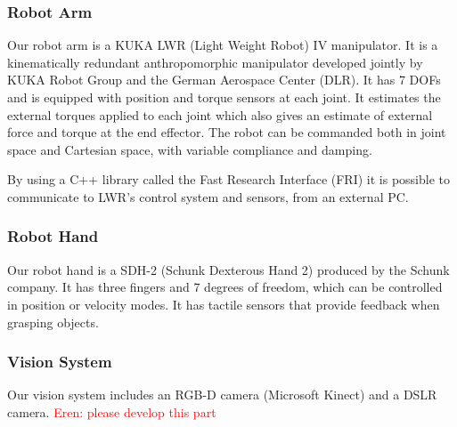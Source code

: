 \subsubsection{Robot Arm}
Our robot arm is a KUKA LWR (Light Weight Robot) IV manipulator.
It is a kinematically redundant anthropomorphic manipulator developed jointly by KUKA Robot Group and the German Aerospace Center (DLR).
It has 7 DOFs and is equipped with position and torque sensors at each joint.
It estimates the external torques applied to each joint which also gives an estimate of external force and torque at the end effector.
The robot can be commanded both in joint space and Cartesian space, with variable compliance and damping.

By using a C++ library called the Fast Research Interface (FRI) it is possible to communicate to LWR's control system and sensors, from an external PC.


\subsubsection{Robot Hand}
Our robot hand is a SDH-2 (Schunk Dexterous Hand 2) produced by the Schunk company.
It has three fingers and 7 degrees of freedom, which can be controlled in position or velocity modes.
It has tactile sensors that provide feedback when grasping objects.


\subsubsection{Vision System}
Our vision system includes an RGB-D camera (Microsoft Kinect) and a DSLR camera.
\textcolor{red}{Eren: please develop this part}


